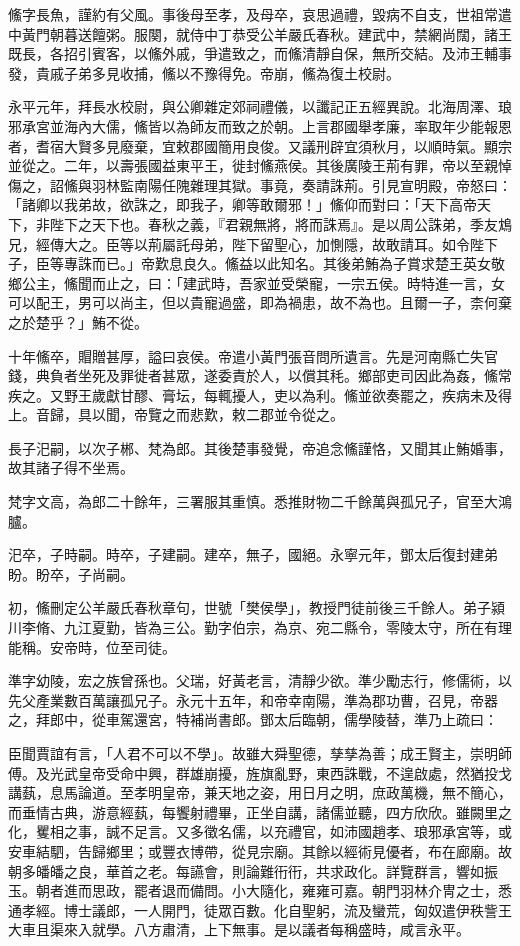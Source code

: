\begin{pinyinscope}
鯈字長魚，謹約有父風。事後母至孝，及母卒，哀思過禮，毀病不自支，世祖常遣中黃門朝暮送饘粥。服闋，就侍中丁恭受公羊嚴氏春秋。建武中，禁網尚闊，諸王既長，各招引賓客，以鯈外戚，爭遣致之，而鯈清靜自保，無所交結。及沛王輔事發，貴戚子弟多見收捕，鯈以不豫得免。帝崩，鯈為復土校尉。

永平元年，拜長水校尉，與公卿雜定郊祠禮儀，以讖記正五經異說。北海周澤、琅邪承宮並海內大儒，鯈皆以為師友而致之於朝。上言郡國舉孝廉，率取年少能報恩者，耆宿大賢多見廢棄，宜敕郡國簡用良俊。又議刑辟宜須秋月，以順時氣。顯宗並從之。二年，以壽張國益東平王，徙封鯈燕侯。其後廣陵王荊有罪，帝以至親悼傷之，詔鯈與羽林監南陽任隗雜理其獄。事竟，奏請誅荊。引見宣明殿，帝怒曰：「諸卿以我弟故，欲誅之，即我子，卿等敢爾邪！」鯈仰而對曰：「天下高帝天下，非陛下之天下也。春秋之義，『君親無將，將而誅焉』。是以周公誅弟，季友鴆兄，經傳大之。臣等以荊屬託母弟，陛下留聖心，加惻隱，故敢請耳。如令陛下子，臣等專誅而已。」帝歎息良久。鯈益以此知名。其後弟鮪為子賞求楚王英女敬鄉公主，鯈聞而止之，曰：「建武時，吾家並受榮寵，一宗五侯。時特進一言，女可以配王，男可以尚主，但以貴寵過盛，即為禍患，故不為也。且爾一子，柰何棄之於楚乎？」鮪不從。

十年鯈卒，賵贈甚厚，謚曰哀侯。帝遣小黃門張音問所遺言。先是河南縣亡失官錢，典負者坐死及罪徙者甚眾，遂委責於人，以償其秏。鄉部吏司因此為姦，鯈常疾之。又野王歲獻甘醪、膏坛，每輒擾人，吏以為利。鯈並欲奏罷之，疾病未及得上。音歸，具以聞，帝覽之而悲歎，敕二郡並令從之。

長子汜嗣，以次子郴、梵為郎。其後楚事發覺，帝追念鯈謹恪，又聞其止鮪婚事，故其諸子得不坐焉。

梵字文高，為郎二十餘年，三署服其重慎。悉推財物二千餘萬與孤兄子，官至大鴻臚。

汜卒，子時嗣。時卒，子建嗣。建卒，無子，國絕。永寧元年，鄧太后復封建弟盼。盼卒，子尚嗣。

初，鯈刪定公羊嚴氏春秋章句，世號「樊侯學」，教授門徒前後三千餘人。弟子潁川李脩、九江夏勤，皆為三公。勤字伯宗，為京、宛二縣令，零陵太守，所在有理能稱。安帝時，位至司徒。

準字幼陵，宏之族曾孫也。父瑞，好黃老言，清靜少欲。準少勵志行，修儒術，以先父產業數百萬讓孤兄子。永元十五年，和帝幸南陽，準為郡功曹，召見，帝器之，拜郎中，從車駕還宮，特補尚書郎。鄧太后臨朝，儒學陵替，準乃上疏曰：

臣聞賈誼有言，「人君不可以不學」。故雖大舜聖德，孳孳為善；成王賢主，崇明師傅。及光武皇帝受命中興，群雄崩擾，旌旗亂野，東西誅戰，不遑啟處，然猶投戈講蓺，息馬論道。至孝明皇帝，兼天地之姿，用日月之明，庶政萬機，無不簡心，而垂情古典，游意經蓺，每饗射禮畢，正坐自講，諸儒並聽，四方欣欣。雖闕里之化，矍相之事，誠不足言。又多徵名儒，以充禮官，如沛國趙孝、琅邪承宮等，或安車結駟，告歸鄉里；或豐衣博帶，從見宗廟。其餘以經術見優者，布在廊廟。故朝多皤皤之良，華首之老。每讌會，則論難衎衎，共求政化。詳覽群言，響如振玉。朝者進而思政，罷者退而備問。小大隨化，雍雍可嘉。朝門羽林介冑之士，悉通孝經。博士議郎，一人開門，徒眾百數。化自聖躬，流及蠻荒，匈奴遣伊秩訾王大車且渠來入就學。八方肅清，上下無事。是以議者每稱盛時，咸言永平。


\end{pinyinscope}
